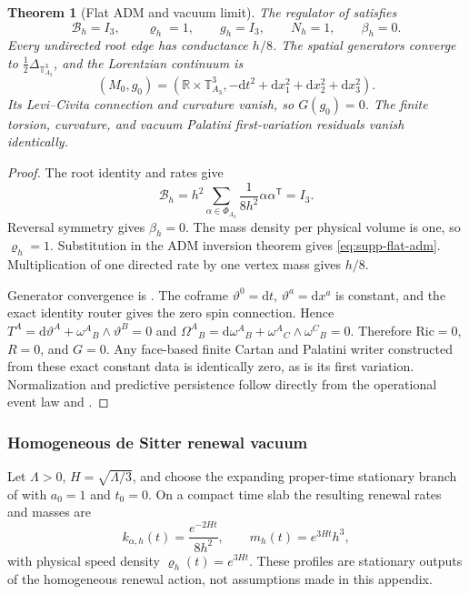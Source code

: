 \documentclass[11pt]{article}
\newtheorem{theorem}{Theorem}[section]
\numberwithin{equation}{section}
\theoremstyle{definition}
\theoremstyle{remark}
\newcommand{\R}{\mathbb R}
\newcommand{\dd}{\mathrm d}
\newcommand{\Ric}{\mathrm{Ric}}
\begin{document}
\begin{theorem}[Flat ADM and vacuum limit]
\label{thm:supp-flat-vacuum}
The regulator of  satisfies
\begin{equation}
 \mathcal B_h=I_3,\qquad
 \varrho_h=1,\qquad
 g_h=I_3,\qquad N_h=1,\qquad\beta_h=0.
 \label{eq:supp-flat-adm}
\end{equation}
Every undirected root edge has conductance $h/8$.  The spatial generators
converge to $\tfrac12\Delta_{\mathbb T^3_{A_3}}$, and the Lorentzian continuum
is
\begin{equation}
 (M_0,g_0)=
 \left(\R\times\mathbb T^3_{A_3},
 -\dd t^2+\dd x_1^2+\dd x_2^2+\dd x_3^2\right).
 \label{eq:supp-flat-lorentzian}
\end{equation}
Its Levi--Civita connection and curvature vanish, so
$G(g_0)=0$.  The finite torsion, curvature, and vacuum Palatini first-variation
residuals vanish identically.
\end{theorem}

\begin{proof}
The root identity and rates give
\[
 \mathcal B_h
 =h^2\sum_{\alpha\in\Phi_{A_3}}
   \frac1{8h^2}\alpha\alpha^{\mathsf T}=I_3.
\]
Reversal symmetry gives $\beta_h=0$.  The mass density per physical volume is
one, so $\varrho_h=1$.  Substitution in the ADM inversion theorem
 gives \eqref{eq:supp-flat-adm}.  Multiplication of
one directed rate by one vertex mass gives $h/8$.

Generator convergence is .  The coframe
$\vartheta^0=\dd t$, $\vartheta^a=\dd x^a$ is constant, and the exact identity
router gives the zero spin connection.  Hence
$T^A=\dd\vartheta^A+\omega^A{}_B\wedge\vartheta^B=0$ and
$\Omega^A{}_B=\dd\omega^A{}_B+\omega^A{}_C\wedge\omega^C{}_B=0$.
Therefore $\Ric=0$, $R=0$, and $G=0$.  Any face-based finite Cartan and
Palatini writer constructed from these exact constant data is identically zero,
as is its first variation.  Normalization and predictive persistence follow directly from the operational event law and .
\end{proof}

\subsubsection{Homogeneous de Sitter renewal vacuum}

Let $\Lambda>0$, $H=\sqrt{\Lambda/3}$, and choose the expanding proper-time
stationary branch of  with
$a_0=1$ and $t_0=0$.  On a compact time slab the resulting renewal rates and
masses are
\begin{equation}
 k_{\alpha,h}(t)=\frac{e^{-2Ht}}{8h^2},
 \qquad
 m_h(t)=e^{3Ht}h^3,
 \label{eq:supp-desitter-rates-mass}
\end{equation}
with physical speed density $\varrho_h(t)=e^{3Ht}$.  These profiles are
stationary outputs of the homogeneous renewal action, not assumptions made in
this appendix.
\end{document}
